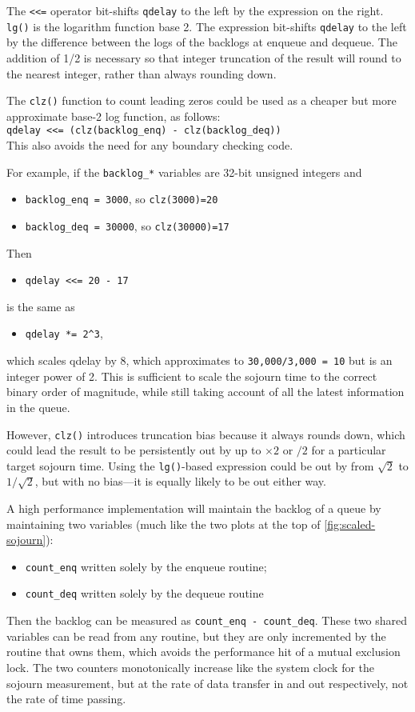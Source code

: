 The \texttt{<<=} operator bit-shifts \texttt{qdelay} to the left by the expression on the right. \texttt{lg()} is the logarithm function base 2. The expression bit-shifts \texttt{qdelay} to the left by the difference between the logs of the backlogs at enqueue and dequeue. The addition of 1/2 is necessary so that integer truncation of the result will round to the nearest integer, rather than always rounding down. 

The \texttt{clz()} function to count leading zeros could be used as a cheaper but more approximate base-2 log function, as follows:\\
{\small\texttt{qdelay <<= (clz(backlog\_enq) - clz(backlog\_deq))}}\\
This also avoids the need for any boundary checking code.

For example, if the \texttt{backlog\_*} variables are 32-bit unsigned integers and
\begin{itemize}[nosep]
	\item[] \texttt{backlog\_enq = 3000}, so \texttt{clz(3000)=20}
	\item[] \texttt{backlog\_deq = 30000}, so \texttt{clz(30000)=17}
\end{itemize}
Then
\begin{itemize}[nosep]
	\item[] \texttt{qdelay <<= 20 - 17}
\end{itemize}
is the same as
\begin{itemize}[nosep]
    \item[] \texttt{qdelay *= 2\^{}3},\\
\end{itemize}
which scales qdelay by 8, which approximates to \texttt{30,000/3,000 = 10} but is an integer power of 2. This is sufficient to scale the sojourn time to the correct binary order of magnitude, while still taking account of all the latest information in the queue.

However, \texttt{clz()} introduces truncation bias because it always rounds down, which could lead the result to be persistently out by up to \(\times2\) or \(/2\) for a particular target sojourn time. Using the \texttt{lg()}-based expression could be out by from \(\sqrt{2}\) to \(1/\sqrt{2}\), but with no bias---it is equally likely to be out either way.

A high performance implementation will maintain the backlog of a queue by maintaining two variables (much like the two plots at the top of \autoref{fig:scaled-sojourn}):
\begin{itemize}[nosep]
	\item[] \texttt{count\_enq} written solely by the enqueue routine;
	\item[] \texttt{count\_deq} written solely by the dequeue routine
\end{itemize}	
Then the backlog can be measured as \texttt{count\_enq - count\_deq}. These two shared variables can be read from any routine, but they are only incremented by the routine that owns them, which avoids the performance hit of a mutual exclusion lock. The two counters monotonically increase like the system clock for the sojourn measurement, but at the rate of data transfer in and out respectively, not the rate of time passing. 


